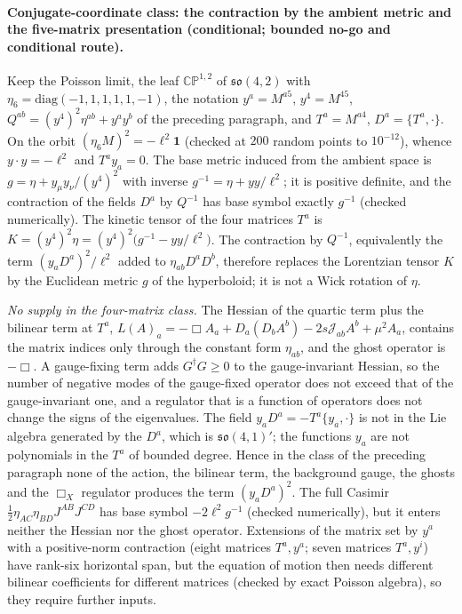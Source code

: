 \paragraph{Conjugate-coordinate class: the contraction by the ambient metric and the five-matrix presentation (conditional; bounded no-go and conditional route).}
Keep the Poisson limit, the leaf \(\mathbb{CP}^{1,2}\) of \(\mathfrak{so}(4,2)\) with \(\eta_6=\mathrm{diag}(-1,1,1,1,1,-1)\), the notation \(y^a=M^{a5}\), \(y^4=M^{45}\), \(Q^{ab}=(y^4)^2\eta^{ab}+y^ay^b\) of the preceding paragraph, and \(T^a=M^{a4}\), \(D^a=\{T^a,\cdot\}\). On the orbit \((\eta_6M)^2=-\ell^2\mathbf 1\) (checked at \(200\) random points to \(10^{-12}\)), whence \(y\cdot y=-\ell^2\) and \(T^ay_a=0\). The base metric induced from the ambient space is \(g=\eta+y_\mu y_\nu/(y^4)^2\) with inverse \(g^{-1}=\eta+yy/\ell^2\); it is positive definite, and the contraction of the fields \(D^a\) by \(Q^{-1}\) has base symbol exactly \(g^{-1}\) (checked numerically). The kinetic tensor of the four matrices \(T^a\) is \(K=(y^4)^2\eta=(y^4)^2\bigl(g^{-1}-yy/\ell^2\bigr)\). The contraction by \(Q^{-1}\), equivalently the term \((y_aD^a)^2/\ell^2\) added to \(\eta_{ab}D^aD^b\), therefore replaces the Lorentzian tensor \(K\) by the Euclidean metric \(g\) of the hyperboloid; it is not a Wick rotation of \(\eta\).

\emph{No supply in the four-matrix class.} The Hessian of the quartic term plus the bilinear term at \(T^a\), \(L(A)_a=-\Box A_a+D_a(D_bA^b)-2s\mathcal J_{ab}A^b+\mu^2A_a\), contains the matrix indices only through the constant form \(\eta_{ab}\), and the ghost operator is \(-\Box\). A gauge-fixing term adds \(G^\dagger G\ge0\) to the gauge-invariant Hessian, so the number of negative modes of the gauge-fixed operator does not exceed that of the gauge-invariant one, and a regulator that is a function of operators does not change the signs of the eigenvalues. The field \(y_aD^a=-T^a\{y_a,\cdot\}\) is not in the Lie algebra generated by the \(D^a\), which is \(\mathfrak{so}(4,1)'\); the functions \(y_a\) are not polynomials in the \(T^a\) of bounded degree. Hence in the class of the preceding paragraph none of the action, the bilinear term, the background gauge, the ghosts and the \(\Box_X\) regulator produces the term \((y_aD^a)^2\). The full Casimir \(\tfrac12\eta_{AC}\eta_{BD}J^{AB}J^{CD}\) has base symbol \(-2\ell^2g^{-1}\) (checked numerically), but it enters neither the Hessian nor the ghost operator. Extensions of the matrix set by \(y^a\) with a positive-norm contraction (eight matrices \(T^a,y^a\); seven matrices \(T^a,y^i\)) have rank-six horizontal span, but the equation of motion then needs different bilinear coefficients for different matrices (checked by exact Poisson algebra), so they require further inputs.

